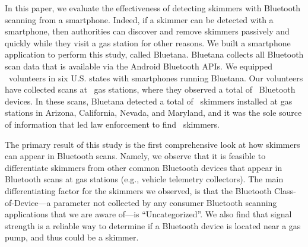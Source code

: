 
In this paper, we evaluate the effectiveness of detecting skimmers with 
Bluetooth scanning from a smartphone.
%
Indeed, if a skimmer can be detected with 
a smartphone, then authorities can discover and remove
skimmers passively and quickly while they visit a gas station for
other reasons.
% 
We built a smartphone application to perform this study, called Bluetana.
%
Bluetana collects all Bluetooth scan data that is available via
the Android Bluetooth APIs.
%
We equipped \numvolunteers~volunteers in six U.S. states with smartphones
running Bluetana. 
%
Our volunteers have collected scans at \visitedgasstations~gas stations, where
%
they observed a total of \totalbtobserved~Bluetooth devices.
%
In these scans, Bluetana detected a total of \totalskimmers~skimmers
installed at gas stations in Arizona, California, Nevada, and Maryland, and it
%
was the sole source of information
that led law enforcement to find \totalskimmersBluetana~skimmers.
%
%
%

%
%
%



The primary result of this study is the first comprehensive look at how 
skimmers can appear in Bluetooth scans.
%
Namely, we observe that it is feasible to differentiate skimmers from other
common Bluetooth devices that appear in Bluetooth scans at gas stations (e.g.,
vehicle telemetry collectors).
%
The main differentiating factor for the skimmers we observed, is that the
Bluetooth Class-of-Device---a parameter not collected by any consumer Bluetooth
scanning applications that we are aware of---is ``Uncategorized''.
%
We also find that signal strength is a reliable way to determine if a Bluetooth
device is located near a gas pump, and thus could be a skimmer.
%
%

